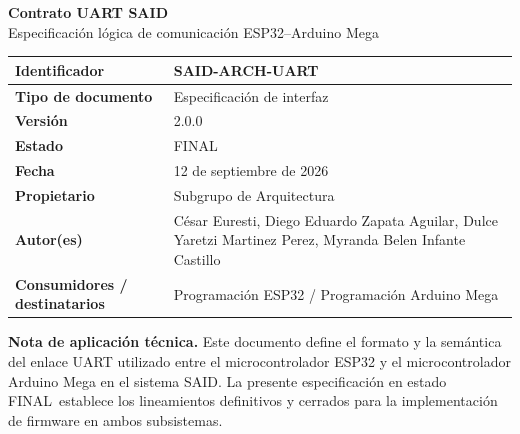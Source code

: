 \documentclass[a4paper,11pt]{article}
\newcommand{\DocumentTitle}{Contrato UART SAID}
\newcommand{\DocumentSubtitle}{Especificación lógica de comunicación ESP32--Arduino Mega}
\newcommand{\DocumentType}{Especificación de interfaz}
\newcommand{\DocumentId}{SAID-ARCH-UART}
\newcommand{\DocumentVersion}{2.0.0}
\newcommand{\DocumentStatus}{FINAL}
\newcommand{\DocumentDate}{12 de septiembre de 2026}
\newcommand{\DocumentOwner}{Subgrupo de Arquitectura}
\newcommand{\DocumentAuthors}{César Euresti, Diego Eduardo Zapata Aguilar, Dulce Yaretzi Martinez Perez, Myranda Belen Infante Castillo}
\newcommand{\DocumentConsumers}{Programación ESP32 / Programación Arduino Mega}
\begin{document}

\begin{center}
    {\LARGE\bfseries \DocumentTitle\\[0.3cm]}
    {\large \DocumentSubtitle}
\end{center}

\vspace{0.6cm}

\noindent\begin{tabularx}{\textwidth}{|>{\bfseries}p{4.2cm}|X|}
    \hline
    Identificador & \DocumentId \\
    \hline
    Tipo de documento & \DocumentType \\
    \hline
    Versión & \DocumentVersion \\
    \hline
    Estado & \DocumentStatus \\
    \hline
    Fecha & \DocumentDate \\
    \hline
    Propietario & \DocumentOwner \\
    \hline
    Autor(es) & \DocumentAuthors \\
    \hline
    Consumidores / destinatarios & \DocumentConsumers \\
    \hline
\end{tabularx}

\vspace{0.8cm}

\noindent\textbf{Nota de aplicación técnica.}
Este documento define el formato y la semántica del enlace UART utilizado entre
el microcontrolador ESP32 y el microcontrolador Arduino Mega en el sistema SAID.
La presente especificación en estado \DocumentStatus\ establece los lineamientos
definitivos y cerrados para la implementación de firmware en ambos subsistemas.

\newpage


\setcounter{tocdepth}{2}
\begingroup
\makeatletter
\renewcommand*\l@section[2]{%
  \ifnum \c@tocdepth >\z@
    \addpenalty\@secpenalty
    \vskip 0.4em \@plus\p@
    \setlength\@tempdima{2.0em}%
    \begingroup
      \parindent \z@ \rightskip \@pnumwidth
      \parfillskip -\@pnumwidth
      {\leavevmode
       \bfseries #1\nobreak\hfil \nobreak\hb@xt@\@pnumwidth{\hss #2}}\par
    \endgroup
  \fi}
\renewcommand*\l@subsection{\@dottedtocline{2}{2.0em}{2.5em}}
\makeatother
\tableofcontents
\endgroup
\newpage
\end{document}
